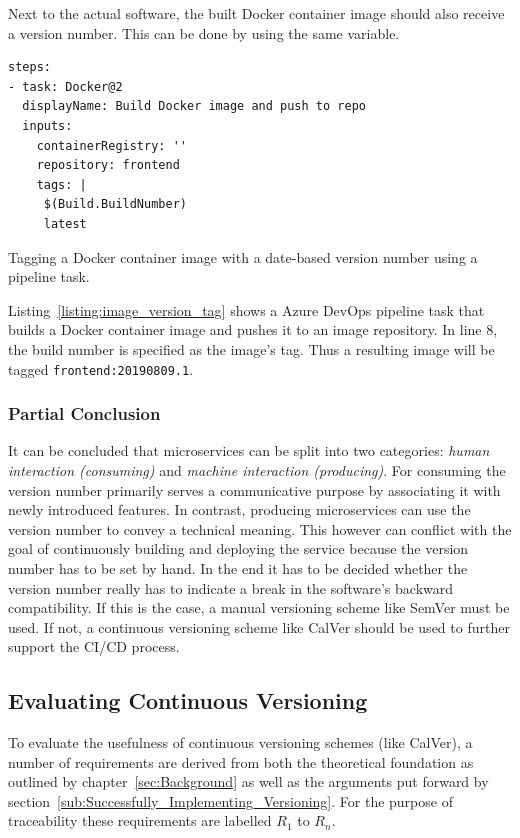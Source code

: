 Next to the actual software, the built Docker container image should also
receive a version number. This can be done by using the same variable.

\begin{listing}[H]
  \begin{verbatim}
steps:
- task: Docker@2
  displayName: Build Docker image and push to repo
  inputs:
    containerRegistry: ''
    repository: frontend
    tags: |
     $(Build.BuildNumber)
     latest
  \end{verbatim}
  \caption{Tagging a Docker container image with a date-based version number
  using a pipeline task.}%
  \label{listing:image_version_tag}
\end{listing}

Listing~\ref{listing:image_version_tag} shows a Azure DevOps pipeline task that
builds a Docker container image and pushes it to an image repository. In line
8, the build number is specified as the image's tag. Thus a resulting image
will be tagged \texttt{frontend:20190809.1}.

\subsubsection{Partial Conclusion}%
\label{ssub:Partial_Conclusion}
It can be concluded that microservices can be split into two categories:
\textit{human interaction (consuming)} and \textit{machine interaction
(producing)}. For consuming the version number primarily serves a communicative
purpose by associating it with newly introduced features. In contrast,
producing microservices can use the version number to convey a technical
meaning. This however can conflict with the goal of continuously building and
deploying the service because the version number has to be set by hand. In the
end it has to be decided whether the version number really has to indicate a
break in the software's backward compatibility. If this is the case, a manual
versioning scheme like SemVer must be used. If not, a continuous versioning
scheme like CalVer should be used to further support the \ac{CI}/\ac{CD}
process.

\subsection{Evaluating Continuous Versioning}%
\label{sub:Evaluating_Continuous_Versioning}
To evaluate the usefulness of continuous versioning schemes (like CalVer), a
number of requirements are derived from both the theoretical foundation as
outlined by chapter~\ref{sec:Background} as well as the arguments put forward
by section~\ref{sub:Successfully_Implementing_Versioning}. For the purpose of
traceability these requirements are labelled $R_1$ to $R_n$.

